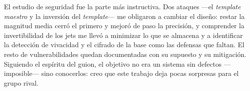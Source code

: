 \documentclass[11pt,a4paper]{article}
\begin{document}
El estudio de seguridad fue la parte más instructiva. Dos ataques ---el \emph{template
maestro} y la inversión del \emph{template}--- me obligaron a cambiar el diseño: restar la
magnitud media cerró el primero y mejoró de paso la precisión, y comprender la invertibilidad
de los jets me llevó a minimizar lo que se almacena y a identificar la detección de vivacidad y
el cifrado de la base como las defensas que faltan. El resto de vulnerabilidades quedan
documentadas con su supuesto y su mitigación. Siguiendo el espíritu del guion, el objetivo no
era un sistema sin defectos ---imposible--- sino conocerlos: creo que este trabajo deja pocas
sorpresas para el grupo rival.
\end{document}

